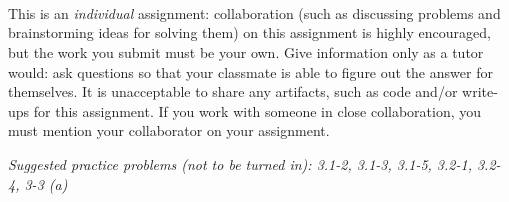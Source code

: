 \documentclass[letterpaper,11pt]{article}
\begin{document}


 \\

 \\

 \\

This is an \emph{individual} assignment: collaboration (such as discussing problems and brainstorming ideas for solving them) on this assignment is highly encouraged, but the work you submit must be your own. Give information only as a tutor would: ask questions so that your classmate is able to figure out the answer for themselves. It is unacceptable to share any artifacts, such as code and/or write-ups for this assignment. If you work with someone in close collaboration, you must mention your collaborator on your assignment.

\emph{Suggested practice problems (not to be turned in): 3.1-2, 3.1-3, 3.1-5, 3.2-1, 3.2-4, 3-3 (a)}
\end{document}
